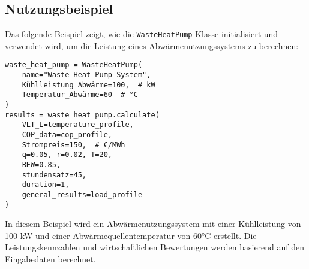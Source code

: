 \subsection{Nutzungsbeispiel}
Das folgende Beispiel zeigt, wie die \texttt{WasteHeatPump}-Klasse initialisiert und verwendet wird, um die Leistung eines Abwärmenutzungssystems zu berechnen:

\begin{verbatim}
waste_heat_pump = WasteHeatPump(
    name="Waste Heat Pump System",
    Kühlleistung_Abwärme=100,  # kW
    Temperatur_Abwärme=60  # °C
)
results = waste_heat_pump.calculate(
    VLT_L=temperature_profile, 
    COP_data=cop_profile, 
    Strompreis=150,  # €/MWh
    q=0.05, r=0.02, T=20, 
    BEW=0.85, 
    stundensatz=45, 
    duration=1, 
    general_results=load_profile
)
\end{verbatim}
In diesem Beispiel wird ein Abwärmenutzungssystem mit einer Kühlleistung von 100 kW und einer Abwärmequellentemperatur von 60°C erstellt. Die Leistungskennzahlen und wirtschaftlichen Bewertungen werden basierend auf den Eingabedaten berechnet.
